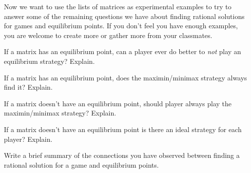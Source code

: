Now we want to use the lists of matrices as experimental examples to try to answer some of the remaining questions we have about finding rational solutions for games and equilibrium points. If you don't feel you have enough examples, you are welcome to create more or gather more from your classmates.


\begin{xca}
If a matrix has an equilibrium point, can a player ever do better to {\it not} play an equilibrium strategy? Explain.%
\end{xca}

\begin{xca} 
If a matrix has an equilibrium point, does the maximin/minimax strategy always find it? Explain.
\end{xca}

\begin{xca}
If a matrix doesn't have an equilibrium point, should  player always play the maximin/minimax strategy? Explain.
\end{xca}

\begin{xca}
If a matrix doesn't have an equilibrium point is there an ideal strategy for each player? Explain.
\end{xca}

\begin{xca}
Write a brief summary of the connections you have observed between finding a rational solution for a game and equilibrium points. 
\end{xca}




%


 